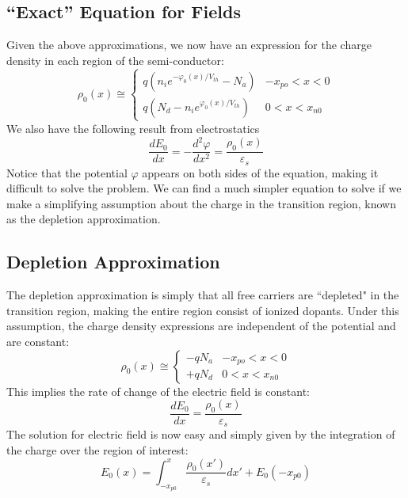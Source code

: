 \subsection{“Exact” Equation for Fields}

Given the above approximations, we now have an expression for the charge density in each region of the semi-conductor:
\begin{equation}
 \rho _0(x) \cong \left\{ 
  \begin{array}{*{20}{c}}
 q({n_i}{e^{ - {\varphi _0}(x)/{V_{th}}}} - {N_a}) &  - {x_{po}} < x < 0\\
 q({N_d} - {n_i}{e^{{\varphi _0}(x)/{V_{th}}}}) & 0 < x < {x_{n0}}
 \end{array} 
 \right.
 \end{equation}
%
We also have the following result from electrostatics
%
\begin{equation} 
	\frac{{d{E_0}}}{{dx}} =  - \frac{{{d^2}\varphi }}{{d{x^2}}} = \frac{{{\rho _0}(x)}}{{{\varepsilon _s}}} 
\end{equation}
%
Notice that the potential $\varphi$ appears on both sides of the equation, making it difficult to solve the problem.   We can find a much simpler equation to solve if we make a simplifying assumption about the charge in the transition region, known as the depletion approximation.
 
\subsection{Depletion Approximation}

The depletion approximation is simply that all free carriers are ``depleted" in the transition region, making the entire region consist of ionized dopants.  Under this assumption, the charge density expressions are independent of the potential and are constant:
%
\begin{equation}
{\rho _0}(x) \cong \left\{ 
	\begin{array}{*{20}{c}}
 		 - q{N_a} &  - {x_{po}} < x < 0\\
 		 + q{N_d} & 0 < x < {x_{n0}}
 \end{array} 
 \right.
 \end{equation}
%
This implies the rate of change of the electric field is constant:
\begin{equation} 
	\frac{{d{E_0}}}{{dx}} = \frac{{{\rho _0}(x)}}{{{\varepsilon _s}}}
\end{equation}
The solution for electric field is now easy and simply given by the integration of the charge over the region of interest:
\begin{equation} {E_0}(x) = \int_{ - {x_{p0}}}^x {\frac{{{\rho _0}(x')}}{{{\varepsilon _s}}}dx'}  + {E_0}( - {x_{p0}}) 
\end{equation}
 

